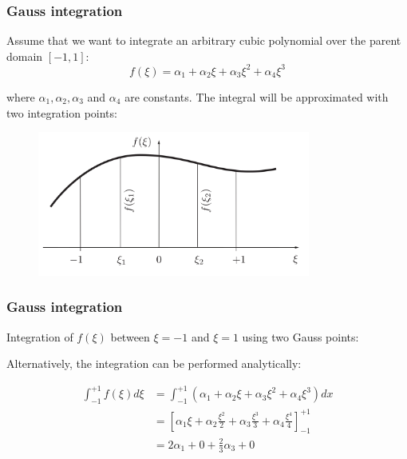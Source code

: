 \documentclass[notes]{beamer}
\begin{document}
\begin{frame}
\frametitle{Gauss integration}
Assume that we want to integrate an arbitrary cubic polynomial over the parent domain $[-1, 1]$:
\begin{equation*}
f(\xi) = \alpha_1 + \alpha_2 \xi + \alpha_3 \xi^2 + \alpha_4 \xi^3
\end{equation*}

where $\alpha_1, \alpha_2, \alpha_3$ and $\alpha_4$ are constants. The integral will be approximated with two integration points:
\begin{figure}[ht]
	\centering
	\includegraphics[width=0.8\textwidth]{figs/gauss-derivation.png}
\end{figure}
\end{frame}

\begin{frame}
\frametitle{Gauss integration}
Integration of $f(\xi)$ between $\xi = -1$ and $\xi = 1$ using two Gauss points:

Alternatively, the integration can be performed analytically:

\begin{align*}
	\int_{-1}^{+1}f(\xi) d\xi & = \int_{-1}^{+1}(\alpha_1 + \alpha_2 \xi + \alpha_3 \xi^2 + \alpha_4 \xi^3) dx \\
	& = \left[ \alpha_1 \xi + \alpha_2 \frac{\xi^2}{2} + \alpha_3 \frac{\xi^3}{3} + \alpha_4 \frac{\xi^4}{4} \right]_{-1}^{+1} \\
	& = 2 \alpha_1 + 0 + \frac{2}{3} \alpha_3 + 0
\end{align*}
\end{frame}
\end{document}
